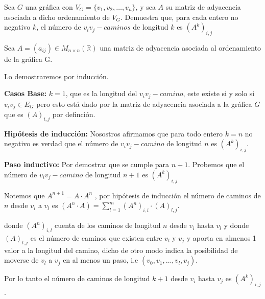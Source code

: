 Sea $G$ una gráfica con $V_G = \{v_1, v_2, \dots ,v_n\}$, y sea $A$ su matriz de adyacencia asociada a dicho ordenamiento de $V_G$. Demuestra que, para cada entero no negativo $k$, el número de $v_iv_j-caminos$ de longitud $k$ es $(A^k)_{i,j}$

Sea $A=(a_{ij})\in M_{n\times n}{(\mathbb{R})}$ una matriz de adyacencia asociada al ordenamiento de la gráfica G.

Lo demostraremos por inducción.

\textbf{Casos Base:} $k=1$, que es la longitud del $v_iv_j-camino$, este existe si y solo si $v_iv_j\in E_G$ pero esto está dado por la matriz de adyacencia asociada a la gráfica $G$ que es $(A)_{i,j}$ por definción.

\textbf{Hipótesis de inducción:} Nosostros afirmamos que para todo entero $k=n$ no negativo es verdad que el número de $v_iv_j-camino$ de longitud $n$ es $(A^k)_{i,j}$.

\textbf{Paso inductivo:} Por demostrar que se cumple para $n+1$.
Probemos que el número de $v_iv_j-camino$ de longitud $n+1$ es $(A^k)_{i,j}$

Notemos que $A^{n+1}=A\cdot A^n$ , por hipótesis de inducción el número de caminos de $n$ desde $v_i$ a $v_l$  es $\displaystyle(A^{n}\cdot A) =\sum_{l=1}^{m} (A^{n})_{i,l} \cdot (A)_{l,j}$.

donde $(A^{n})_{i,l}$ cuenta de los caminos de longitud $n$ desde $v_i$ hasta $v_l$ y donde $(A)_{l,j}$ es el número de caminos que existen entre $v_l$ y $v_j$ y aporta en almenos 1 valor a la longitud del camino, dicho de otro modo indica la posibilidad de moverse de $v_l$ a $v_j$ en al menos un paso, i.e $(v_0,v_1,\dots,v_l,v_j)$. 

Por lo tanto el número de caminos de longitud $k+1$ desde $v_{i}$ hasta $v_j$ es $(A^k)_{i,j}$.